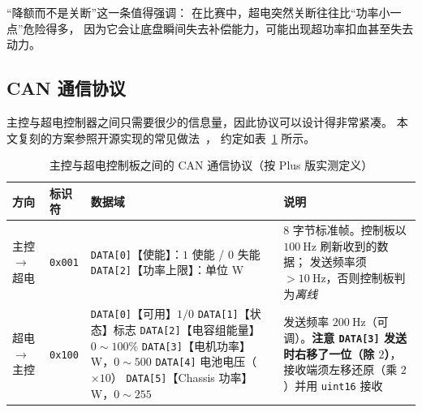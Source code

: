 \documentclass[cn,blue,11pt,device=normal]{elegantnote}
\begin{document}
“降额而不是关断”这一条值得强调：
在比赛中，超电突然关断往往比“功率小一点”危险得多，
因为它会让底盘瞬间失去补偿能力，可能出现超功率扣血甚至失去动力。

\subsection{CAN 通信协议}

主控与超电控制器之间只需要很少的信息量，因此协议可以设计得非常紧凑。
本文复刻的方案参照开源实现的常见做法~\cite{glutplusmanual,hitszsupercap,pspsupercap}，
约定如表~\ref{tab:scCAN} 所示。

\begin{table}[htbp]
  \centering
  \small
  \caption{主控与超电控制板之间的 CAN 通信协议（按 Plus 版实测定义）}
  \label{tab:scCAN}
  \begin{tabular}{@{}>{\raggedright\arraybackslash}p{}>{\raggedright\arraybackslash}p{}>{\raggedright\arraybackslash}p{}>{\raggedright\arraybackslash}p{}@{}}
    \toprule
    方向 & 标识符 & 数据域 & 说明 \\
    \midrule
    主控 $\to$ 超电 & \texttt{0x001} &
    \texttt{DATA[0]}【使能】：$1$ 使能 / $0$ 失能\newline
    \texttt{DATA[2]}【功率上限】：单位 W &
    $8$ 字节标准帧。控制板以 $100\ \mathrm{Hz}$ 刷新收到的数据；
    发送频率须 $>10\ \mathrm{Hz}$，否则控制板判为\emph{离线} \\[5pt]
    超电 $\to$ 主控 & \texttt{0x100} &
    \texttt{DATA[0]}【可用】$1/0$\newline
    \texttt{DATA[1]}【状态】标志\newline
    \texttt{DATA[2]}【电容组能量】$0\sim100\%$\newline
    \texttt{DATA[3]}【电机功率】W，$0\sim500$\newline
    \texttt{DATA[4]} 电池电压（$\times10$）\newline
    \texttt{DATA[5]}【Chassis 功率】W，$0\sim255$ &
    发送频率 $200\ \mathrm{Hz}$（可调）。\textbf{注意
    \texttt{DATA[3]} 发送时右移了一位（除 $2$）}，
    接收端须左移还原（乘 $2$）并用 \texttt{uint16} 接收 \\
    \bottomrule
  \end{tabular}
\end{table}
\end{document}
